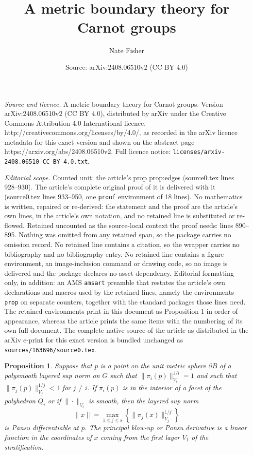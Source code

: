 \documentclass[10pt,a4paper]{amsart}
\title{A metric boundary theory for Carnot groups}
\author{Nate Fisher}
\date{Source: arXiv:2408.06510v2 (CC BY 4.0)}
\newtheorem{prop}{Proposition}
\newcommand{\norm}[1]{\|#1\|}
\begin{document}
\maketitle

\noindent\emph{Source and licence.} A metric boundary theory for Carnot groups. Version arXiv:2408.06510v2 (CC BY 4.0), distributed by arXiv under the Creative Commons Attribution 4.0 International licence, http://creativecommons.org/licenses/by/4.0/, as recorded in the arXiv licence metadata for this exact version and shown on the abstract page https://arxiv.org/abs/2408.06510v2. Full licence notice: \texttt{licenses/arxiv-2408.06510-CC-BY-4.0.txt}.\par\smallskip

\noindent\textit{Editorial scope.} Counted unit: the article's prop prop:edges (source0.tex lines 928--930). The article's complete original proof of it is delivered with it (source0.tex lines 933--950, one \texttt{proof} environment of 18 lines). No mathematics is written, repaired or re-derived: the statement and the proof are the article's own lines, in the article's own notation, and no retained line is substituted or re-flowed.  Retained uncounted as the source-local context the proof needs: lines 890--895.  Nothing was omitted from any retained span, so the package carries no omission record.  No retained line contains a citation, so the wrapper carries no bibliography and no bibliography entry.  No retained line contains a figure environment, an image-inclusion command or drawing code, so no image is delivered and the package declares no asset dependency.  Editorial formatting only, in addition: an AMS \texttt{amsart} preamble that restates the article's own declarations and macros used by the retained lines, namely the environments \texttt{prop} on separate counters, together with the standard packages those lines need.  The retained environments print in this document as Proposition 1 in order of appearance, whereas the article prints the same items with the numbering of its own full document.  The complete native source of the article as distributed in the arXiv e-print for this exact version is bundled unchanged as \texttt{sources/163696/source0.tex}.
\begin{prop}\label{prop:pansuDiff} Suppose that $p$ is a point on the unit metric sphere $\partial B$ of a polysmooth layered sup norm on $G$ such that $\norm{\pi_i(p)}_{V_i}^{1/i} = 1$ and such that $\norm{\pi_j(p)}_{V_j}^{1/j} < 1$ for $j\neq i$. If $\pi_i(p)$ is in the interior of a facet of the polyhedron $Q_i$ or if $\norm{\cdot}_{V_i}$ is smooth, then the layered sup norm
\[
\norm{x} = \max_{1\leq j \leq s} \left\{\norm{\pi_j(x)}_{V_j}^{1/j}\right \}
\]
is Pansu differentiable at $p$. The principal blow-up or Pansu derivative is a linear function in the coordinates of $x$ coming from the first layer $V_1$ of the stratification.
\end{prop}
\end{document}
